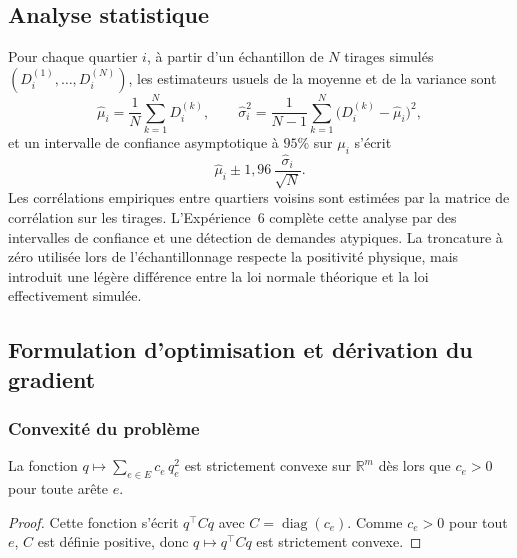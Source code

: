 \documentclass[11pt]{ama-article}
\begin{document}
\subsection{Analyse statistique}
\label{sec:statistique}

Pour chaque quartier $i$, à partir d'un échantillon de $N$ tirages simulés
$(D_i^{(1)},\dots,D_i^{(N)})$, les estimateurs usuels de la moyenne et de la variance sont
\begin{equation}
\hat{\mu}_i = \frac{1}{N}\sum_{k=1}^{N} D_i^{(k)}, \qquad
\hat{\sigma}_i^2 = \frac{1}{N-1}\sum_{k=1}^{N}\big(D_i^{(k)}-\hat{\mu}_i\big)^2,
\end{equation}
et un intervalle de confiance asymptotique à $95\%$ sur $\mu_i$ s'écrit
\begin{equation}
\hat{\mu}_i \pm 1{,}96\,\frac{\hat{\sigma}_i}{\sqrt{N}}.
\end{equation}
Les corrélations empiriques entre quartiers voisins sont estimées par la matrice de corrélation
sur les tirages. L'Expérience~6 complète cette analyse par des intervalles de confiance et une
détection de demandes atypiques. La troncature à zéro utilisée lors de l'échantillonnage
respecte la positivité physique, mais introduit une légère différence entre la loi normale
théorique et la loi effectivement simulée.

\subsection{Formulation d'optimisation et dérivation du gradient}
\label{sec:optimisation}

\subsubsection{Convexité du problème}

\begin{proposition}
La fonction $q\mapsto\sum_{e\in E} c_e\,q_e^2$ est strictement convexe sur $\mathbb{R}^m$ dès
lors que $c_e>0$ pour toute arête $e$.
\end{proposition}

\begin{proof}
Cette fonction s'écrit $q^\top C q$ avec $C=\operatorname{diag}(c_e)$. Comme $c_e>0$ pour tout
$e$, $C$ est définie positive, donc $q\mapsto q^\top Cq$ est strictement convexe.
\end{proof}
\end{document}
